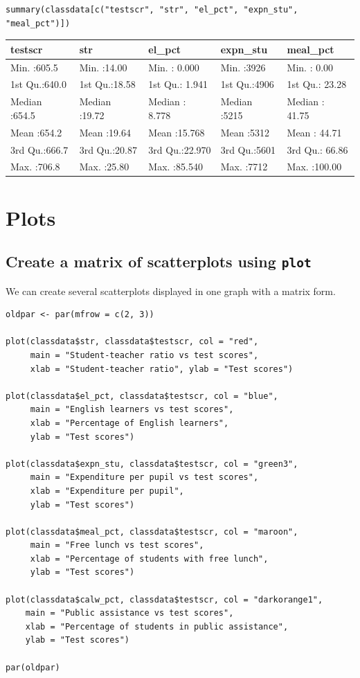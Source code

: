 \documentclass[11pt]{article}
\begin{document}
\begin{verbatim}
summary(classdata[c("testscr", "str", "el_pct", "expn_stu", "meal_pct")])
\end{verbatim}

\begin{center}
\begin{tabular}{lllll}
testscr & str & el\_pct & expn\_stu & meal\_pct\\
\hline
Min.   :605.5 & Min.   :14.00 & Min.   : 0.000 & Min.   :3926 & Min.   :  0.00\\
1st Qu.:640.0 & 1st Qu.:18.58 & 1st Qu.: 1.941 & 1st Qu.:4906 & 1st Qu.: 23.28\\
Median :654.5 & Median :19.72 & Median : 8.778 & Median :5215 & Median : 41.75\\
Mean   :654.2 & Mean   :19.64 & Mean   :15.768 & Mean   :5312 & Mean   : 44.71\\
3rd Qu.:666.7 & 3rd Qu.:20.87 & 3rd Qu.:22.970 & 3rd Qu.:5601 & 3rd Qu.: 66.86\\
Max.   :706.8 & Max.   :25.80 & Max.   :85.540 & Max.   :7712 & Max.   :100.00\\
\end{tabular}
\end{center}


\section{Plots}
\label{sec:org41326aa}
\subsection*{Create a matrix of scatterplots using \texttt{plot}}
\label{sec:orge6d89e7}
We can create several scatterplots displayed in one graph with a
matrix form.

\begin{verbatim}
oldpar <- par(mfrow = c(2, 3))

plot(classdata$str, classdata$testscr, col = "red",
     main = "Student-teacher ratio vs test scores",
     xlab = "Student-teacher ratio", ylab = "Test scores")

plot(classdata$el_pct, classdata$testscr, col = "blue",
     main = "English learners vs test scores",
     xlab = "Percentage of English learners",
     ylab = "Test scores")

plot(classdata$expn_stu, classdata$testscr, col = "green3",
     main = "Expenditure per pupil vs test scores",
     xlab = "Expenditure per pupil",
     ylab = "Test scores")

plot(classdata$meal_pct, classdata$testscr, col = "maroon",
     main = "Free lunch vs test scores",
     xlab = "Percentage of students with free lunch",
     ylab = "Test scores")

plot(classdata$calw_pct, classdata$testscr, col = "darkorange1",
    main = "Public assistance vs test scores",
    xlab = "Percentage of students in public assistance",
    ylab = "Test scores")

par(oldpar)
\end{verbatim}
\end{document}
